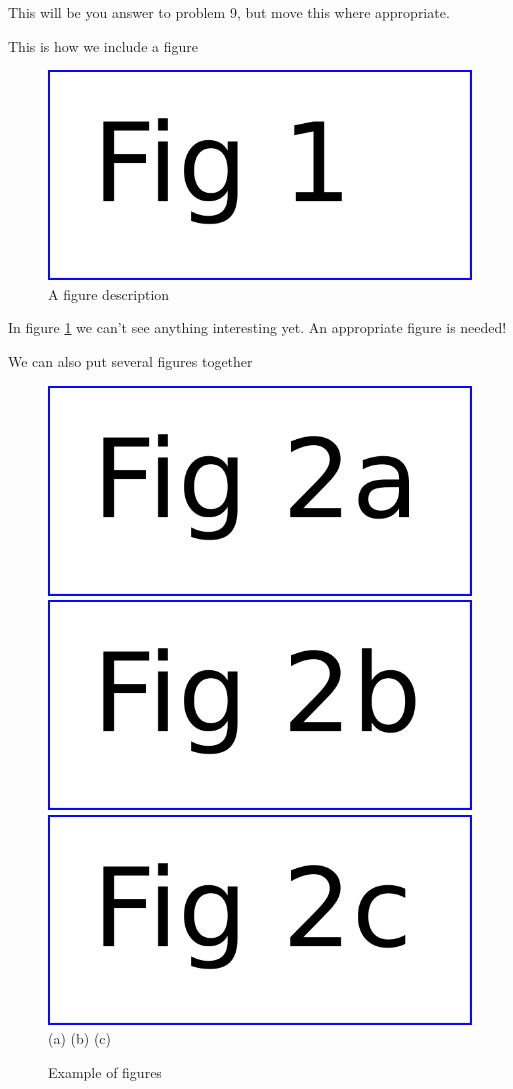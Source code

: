 \documentclass{mm2}
\begin{document}
\vspace{5mm}
\begin{answer}{9}
  This will be you answer to problem 9, but move this where appropriate.
\end{answer}


This is how we include a figure

\begin{figure}[h]
  \begin{center}
  \includegraphics[width=.5\textwidth]{Fig1.pdf}
  \caption{A figure description
  \label{fig_one} %
  }
  \end{center}
\end{figure}

In figure \ref{fig_one} we can't see anything interesting yet.
An appropriate figure is needed!


We can also put several figures together
\begin{figure}[h]
  \begin{center}
  \includegraphics[width=.32\textwidth]{Fig2a.pdf}
  \includegraphics[width=.32\textwidth]{Fig2b.pdf}
  \includegraphics[width=.32\textwidth]{Fig2c.pdf}
  \break
  (a)\hspace{33mm} (b) \hspace{33mm} (c)
  \caption{Example of figures
    \label{fig_two} %
  }
  \end{center}
\end{figure}
\end{document}
